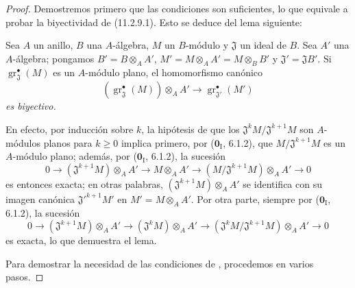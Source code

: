 \begin{proof}
Demostremos primero que las condiciones son suficientes, lo que equivale a probar
la biyectividad de (11.2.9.1). Esto se deduce del lema siguiente:




\begin{lemma}[11.2.9.2]
\label{IV.11.2.9.2}
Sea $A$ un anillo, $B$ una $A$-álgebra, $M$ un $B$-módulo y $\mathfrak J$ un ideal de $B$. Sea $A'$ una $A$-álgebra; pongamos $B'=B\otimes_AA'$, $M'=M\otimes_AA'=M\otimes_BB'$ y $\mathfrak J'=\mathfrak JB'$. Si $\operatorname{gr}_{\mathfrak J}^\bullet(M)$ es un $A$-módulo plano, el homomorfismo canónico
\[
(\operatorname{gr}_{\mathfrak J}^\bullet(M))\otimes_AA'
\longrightarrow \operatorname{gr}_{\mathfrak J'}^\bullet(M')
\]
\emph{es biyectivo.}
\end{lemma}



En efecto, por inducción sobre $k$, la hipótesis de que los $\mathfrak J^kM/\mathfrak J^{k+1}M$ son $A$-módulos planos para $k\geq0$ implica primero, por ($\mathbf 0_{\mathrm I}$, 6.1.2), que $M/\mathfrak J^{k+1}M$ es un $A$-módulo plano; además, por ($\mathbf 0_{\mathrm I}$, 6.1.2), la sucesión
\[
0\longrightarrow(\mathfrak J^{k+1}M)\otimes_AA'
\longrightarrow M\otimes_AA'
\longrightarrow(M/\mathfrak J^{k+1}M)\otimes_AA'\longrightarrow0
\]
es entonces exacta; en otras palabras, $(\mathfrak J^{k+1}M)\otimes_AA'$ se identifica con su imagen canónica $\mathfrak J'^{k+1}M'$ en $M'=M\otimes_AA'$. Por otra parte, siempre por ($\mathbf 0_{\mathrm I}$, 6.1.2), la sucesión
\[
0\longrightarrow(\mathfrak J^{k+1}M)\otimes_AA'
\longrightarrow(\mathfrak J^kM)\otimes_AA'
\longrightarrow(\mathfrak J^kM/\mathfrak J^{k+1}M)\otimes_AA'
\longrightarrow0
\]
es exacta, lo que demuestra el lema.

Para demostrar la necesidad de las condiciones de , procedemos en varios pasos.


\end{proof}

